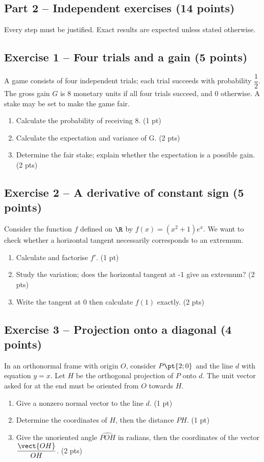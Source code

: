 \mxnewpage\subsection*{Part 2 -- Independent exercises (14 points)}
Every step must be justified. Exact results are expected unless stated otherwise.
\subsection*{Exercise 1 -- Four trials and a gain (5 points)}
A game consists of four independent trials; each trial succeeds with probability $\dfrac12$. The gross gain $G$ is 8 monetary units if all four trials succeed, and 0 otherwise. A stake may be set to make the game fair.
\begin{enumerate}
\item Calculate the probability of receiving 8. \hfill(1 pt)
\item Calculate the expectation and variance of G. \hfill(2 pts)
\item Determine the fair stake; explain whether the expectation is a possible gain. \hfill(2 pts)
\end{enumerate}
\subsection*{Exercise 2 -- A derivative of constant sign (5 points)}
Consider the function $f$ defined on $\R$ by $f(x)=(x^2+1)e^x$. We want to check whether a horizontal tangent necessarily corresponds to an extremum.
\begin{enumerate}
\item Calculate and factorise $f\prime$. \hfill(1 pt)
\item Study the variation; does the horizontal tangent at -1 give an extremum? \hfill(2 pts)
\item Write the tangent at 0 then calculate $f(1)$ exactly. \hfill(2 pts)
\end{enumerate}
\subsection*{Exercise 3 -- Projection onto a diagonal (4 points)}
In an orthonormal frame with origin $O$, consider $P\pt{2;0}$ and the line $d$ with equation $y=x$. Let $H$ be the orthogonal projection of $P$ onto $d$. The unit vector asked for at the end must be oriented from $O$ towards $H$.
\begin{enumerate}
\item Give a nonzero normal vector to the line $d$. \hfill(1 pt)
\item Determine the coordinates of $H$, then the distance $PH$. \hfill(1 pt)
\item Give the unoriented angle $\widehat{POH}$ in radians, then the coordinates of the vector $\dfrac{\vect{OH}}{OH}$. \hfill(2 pts)
\end{enumerate}
